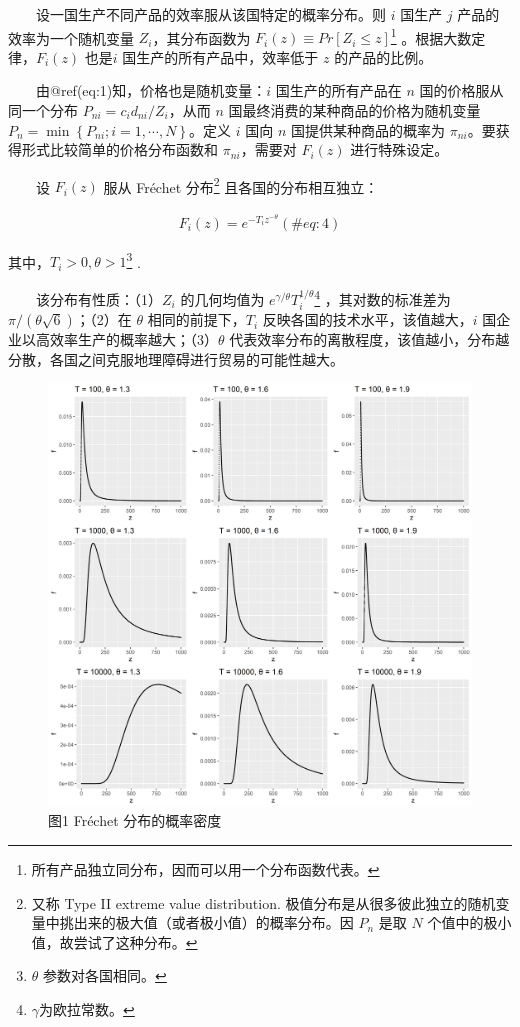 \documentclass[]{tufte-handout}
\begin{document}
　　设一国生产不同产品的效率服从该国特定的概率分布。则 \(i\) 国生产
\(j\) 产品的效率为一个随机变量 \(Z_i\)，其分布函数为
\(F_i(z) \equiv Pr[Z_i \le z]\)\footnote{所有产品独立同分布，因而可以用一个分布函数代表。}
。根据大数定律，\(F_i(z)\) 也是\(i\) 国生产的所有产品中，效率低于 \(z\)
的产品的比例。

　　由@ref(eq:1)知，价格也是随机变量：\(i\) 国生产的所有产品在 \(n\)
国的价格服从同一个分布 \(P_{n i}=c_{i} d_{n i} / Z_{i}\)，从而 \(n\)
国最终消费的某种商品的价格为随机变量
\(P_{n}=\min \left\{P_{n i} ; i=1, \cdots, N\right\}\)。定义 \(i\) 国向
\(n\) 国提供某种商品的概率为
\(\pi_{n i}\)。{要获得形式比较简单的价格分布函数和 \(\pi_{n i}\)，需要对
\(F_i(z)\) 进行特殊设定}。

　　设 \(F_i(z)\) 服从 Fréchet 分布\footnote{又称 Type II extreme value
  distribution.
  极值分布是从很多彼此独立的随机变量中挑出来的极大值（或者极小值）的概率分布。因
  \(P_n\) 是取 \(N\) 个值中的极小值，故尝试了这种分布。}
且各国的分布相互独立：

\begin{align}
F_{i}(z)=e^{-T_{i} z^{-\theta}} (\#eq:4)
\end{align}

其中，\(T_i>0, \theta >1\)\footnote{\(\theta\) 参数对各国相同。} .

　　该分布有性质：（1）\(Z_i\) 的几何均值为
\(e^{\gamma/\theta}T_i^{1/\theta}\)\footnote{\(\gamma\)为欧拉常数。}
，其对数的标准差为 \(\pi/(\theta \sqrt{6})\)；（2）在 \(\theta\)
相同的前提下，\(T_i\) 反映各国的技术水平，该值越大，\(i\)
国企业以高效率生产的概率越大；（3）\(\theta\)
代表效率分布的离散程度，该值越小，分布越分散，各国之间克服地理障碍进行贸易的可能性越大。

\begin{figure}

{\centering \includegraphics[width=1\linewidth]{Figures/Frechet} 

}

\caption[图1 Fréchet 分布的概率密度]{图1 Fréchet 分布的概率密度}\label{fig:p1}
\end{figure}
\end{document}
